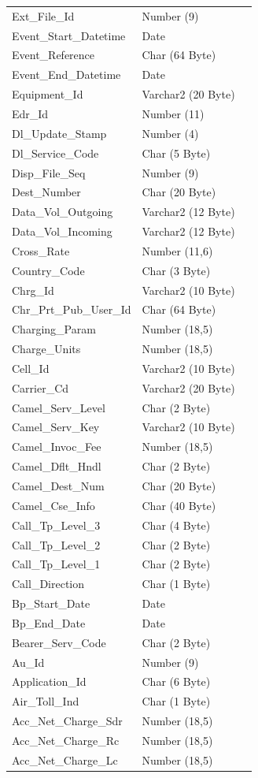 \documentclass[12pt,twoside]{article}
\begin{document}
\begin{longtable}{l|l|l}
Ext\_File\_Id & Number (9) & \\
Event\_Start\_Datetime & Date & \\
Event\_Reference & Char (64 Byte) & \\
Event\_End\_Datetime & Date & \\
Equipment\_Id & Varchar2 (20 Byte) & \\
Edr\_Id & Number (11) & \\
Dl\_Update\_Stamp & Number (4) & \\
Dl\_Service\_Code & Char (5 Byte) & \\
Disp\_File\_Seq & Number (9) & \\
Dest\_Number & Char (20 Byte) & \\
Data\_Vol\_Outgoing & Varchar2 (12 Byte) & \\
Data\_Vol\_Incoming & Varchar2 (12 Byte) & \\
Cross\_Rate & Number (11,6) & \\
Country\_Code & Char (3 Byte) & \\
Chrg\_Id & Varchar2 (10 Byte) & \\
Chr\_Prt\_Pub\_User\_Id & Char (64 Byte) & \\
Charging\_Param & Number (18,5) & \\
Charge\_Units & Number (18,5) & \\
Cell\_Id & Varchar2 (10 Byte) & \\
Carrier\_Cd & Varchar2 (20 Byte) & \\
Camel\_Serv\_Level & Char (2 Byte) & \\
Camel\_Serv\_Key & Varchar2 (10 Byte) & \\
Camel\_Invoc\_Fee & Number (18,5) & \\
Camel\_Dflt\_Hndl & Char (2 Byte) & \\
Camel\_Dest\_Num & Char (20 Byte) & \\
Camel\_Cse\_Info & Char (40 Byte) & \\
Call\_Tp\_Level\_3 & Char (4 Byte) & \\
Call\_Tp\_Level\_2 & Char (2 Byte) & \\
Call\_Tp\_Level\_1 & Char (2 Byte) & \\
Call\_Direction & Char (1 Byte) & \\
Bp\_Start\_Date & Date & \\
Bp\_End\_Date & Date & \\
Bearer\_Serv\_Code & Char (2 Byte) & \\
Au\_Id & Number (9) & \\
Application\_Id & Char (6 Byte) & \\
Air\_Toll\_Ind & Char (1 Byte) & \\
Acc\_Net\_Charge\_Sdr & Number (18,5) & \\
Acc\_Net\_Charge\_Rc & Number (18,5) & \\
Acc\_Net\_Charge\_Lc & Number (18,5) & \\
\hline
\end{longtable}
\normalsize
\newpage
\end{document}
